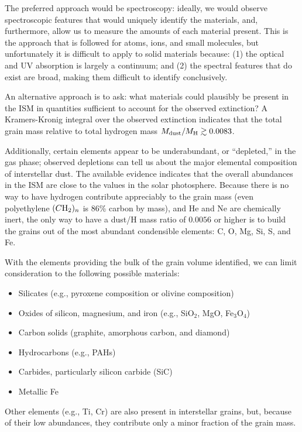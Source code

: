 \documentclass[a4paper,10pt]{article}
\begin{document}
{\noindent}The preferred approach would be spectroscopy: ideally, we would observe spectroscopic features that would uniquely identify the materials, and, furthermore, allow us to measure the amounts of each material present. This is the approach that is followed for atoms, ions, and small molecules, but unfortunately it is difficult to apply to solid materials because: (1) the optical and UV absorption is largely a continuum; and (2) the spectral features that do exist are broad, making them difficult to identify conclusively.

{\noindent}An alternative approach is to ask: what materials could plausibly be present in the ISM in quantities sufficient to account for the observed extinction? A Kramers-Kronig integral over the observed extinction indicates that the total grain mass relative to total hydrogen mass $M_{\rm dust}/M_{\rm H}\gtrsim0.0083$.

{\noindent}Additionally, certain elements appear to be underabundant, or ``depleted,'' in the gas phase; observed depletions can tell us about the major elemental composition of interstellar dust. The available evidence indicates that the overall abundances in the ISM are close to the values in the solar photosphere. Because there is no way to have hydrogen contribute appreciably to the grain mass (even polyethylene $(C{\rm H}_2)_n$ is 86\% carbon by mass), and He and Ne are chemically inert, the only way to have a dust/H mass ratio of $0.0056$ or higher is to build the grains out of the most abundant condensible elements: C, O, Mg, Si, S, and Fe.

{\noindent}With the elements providing the bulk of the grain volume identified, we can limit consideration to the following possible materials:

\begin{itemize}
    \item Silicates (e.g., pyroxene composition or olivine composition)
    \item Oxides of silicon, magnesium, and iron (e.g., SiO$_2$, MgO, Fe$_3$O$_4$)
    \item Carbon solids (graphite, amorphous carbon, and diamond)
    \item Hydrocarbons (e.g., PAHs)
    \item Carbides, particularly silicon carbide (SiC)
    \item Metallic Fe
\end{itemize}

{\noindent}Other elements (e.g., Ti, Cr) are also present in interstellar grains, but, because of their low abundances, they contribute only a minor fraction of the grain mass.
\end{document}
